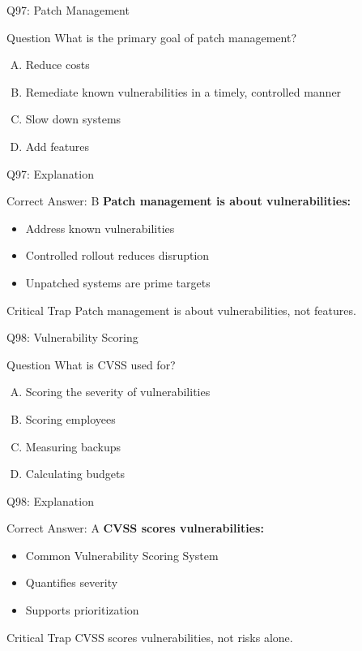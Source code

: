 \documentclass{beamer}
\begin{document}
	\begin{frame}{Q97: Patch Management}
		\begin{block}{Question}
			What is the primary goal of patch management?
		\end{block}
		\begin{enumerate}[(A)]
			\item Reduce costs
			\item Remediate known vulnerabilities in a timely, controlled manner
			\item Slow down systems
			\item Add features
		\end{enumerate}
	\end{frame}
	
	\begin{frame}{Q97: Explanation}
		\begin{block}{Correct Answer: B}
			\textbf{Patch management is about vulnerabilities:}
			\begin{itemize}
				\item Address known vulnerabilities
				\item Controlled rollout reduces disruption
				\item Unpatched systems are prime targets
			\end{itemize}
		\end{block}
		\begin{alertblock}{Critical Trap}
			Patch management is about vulnerabilities, not features.
		\end{alertblock}
	\end{frame}
	
	\begin{frame}{Q98: Vulnerability Scoring}
		\begin{block}{Question}
			What is CVSS used for?
		\end{block}
		\begin{enumerate}[(A)]
			\item Scoring the severity of vulnerabilities
			\item Scoring employees
			\item Measuring backups
			\item Calculating budgets
		\end{enumerate}
	\end{frame}
	
	\begin{frame}{Q98: Explanation}
		\begin{block}{Correct Answer: A}
			\textbf{CVSS scores vulnerabilities:}
			\begin{itemize}
				\item Common Vulnerability Scoring System
				\item Quantifies severity
				\item Supports prioritization
			\end{itemize}
		\end{block}
		\begin{alertblock}{Critical Trap}
			CVSS scores vulnerabilities, not risks alone.
		\end{alertblock}
	\end{frame}
	
\end{document}
